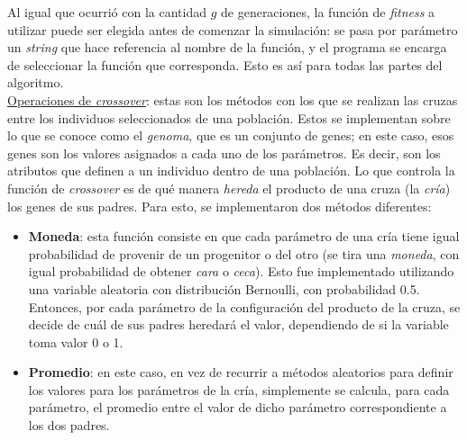 \documentclass[12pt,a4paper]{article}
\begin{document}
    Al igual que ocurrió con la cantidad $g$ de generaciones, la función de \textit{fitness} a utilizar puede ser elegida antes de comenzar la simulación: se pasa por parámetro un \textit{string} que hace referencia al nombre de la función, y el programa se encarga de seleccionar la función que corresponda. Esto es así para todas las partes del algoritmo. \\[4pt]
    
    \underline{Operaciones de \textit{crossover}}: estas son los métodos con los que se realizan las cruzas entre los individuos seleccionados de una población. Estos se implementan sobre lo que se conoce como el \textit{genoma}, que es un conjunto de genes; en este caso, esos genes son los valores asignados a cada uno de los parámetros. Es decir, son los atributos que definen a un individuo dentro de una población. Lo que controla la función de \textit{crossover} es de qué manera \textit{hereda} el producto de una cruza (la \textit{cría}) los genes de sus padres. Para esto, se implementaron dos métodos diferentes:
        \begin{itemize}
            \item \textbf{Moneda}: esta función consiste en que cada parámetro de una cría tiene igual probabilidad de provenir de un progenitor o del otro (se tira una \textit{moneda}, con igual probabilidad de obtener \textit{cara} o \textit{ceca}). Esto fue implementado utilizando una variable aleatoria con distribución Bernoulli, con probabilidad 0.5. Entonces, por cada parámetro de la configuración del producto de la cruza, se decide de cuál de sus padres heredará el valor, dependiendo de si la variable toma valor 0 o 1.
            \item \textbf{Promedio}: en este caso, en vez de recurrir a métodos aleatorios para definir los valores para los parámetros de la cría, simplemente se calcula, para cada parámetro, el promedio entre el valor de dicho parámetro correspondiente a los dos padres.
        \end{itemize}
        
\end{document}
